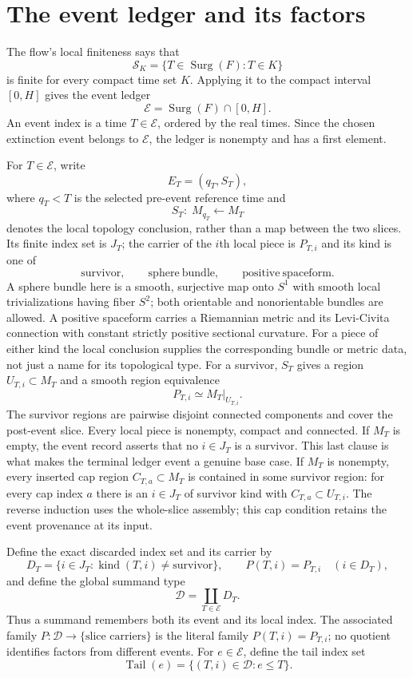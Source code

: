 \section{The event ledger and its factors}
\label{sec:finite-event-ledger}

The flow's local finiteness says that
\[
  \mathcal S_K=\{T\in\operatorname{Surg}(F):T\in K\}
\]
is finite for every compact time set $K$.  Applying it to the compact interval
$[0,H]$ gives the event ledger
\begin{equation}
  \mathcal E=\operatorname{Surg}(F)\cap[0,H].
  \label{eq:finite-ledger}
\end{equation}
An event index is a time $T\in\mathcal E$, ordered by the real
times.  Since the chosen extinction event belongs to $\mathcal E$, the ledger
is nonempty and has a first element.

For $T\in\mathcal E$, write
\[
  E_T=(q_T,S_T),
\]
where $q_T<T$ is the selected pre-event reference time and
\[
  S_T:\;M_{q_T}\longleftarrow M_T
\]
denotes the local topology conclusion, rather than a map between the two
slices.  Its finite index set is $J_T$; the carrier
of the $i$th local piece is $P_{T,i}$ and its kind is one of
\[
  \mathrm{survivor},\qquad \mathrm{sphere\ bundle},\qquad
  \mathrm{positive\ spaceform}.
\]
A sphere bundle here is a smooth, surjective map onto $S^1$ with smooth local
trivializations having fiber $S^2$; both orientable and nonorientable bundles
are allowed.  A positive spaceform carries a Riemannian metric and its
Levi-Civita connection with constant strictly positive sectional curvature.
For a piece of either kind the local conclusion supplies the corresponding
bundle or metric data, not just a name for its topological type.
For a survivor, $S_T$ gives a region $U_{T,i}\subset M_T$ and a smooth region
equivalence
\[
  P_{T,i}\simeq M_T|_{U_{T,i}}.
\]
The survivor regions are pairwise disjoint connected components and cover the
post-event slice.  Every local piece is nonempty, compact and connected.  If $M_T$ is
empty, the event record asserts that no $i\in J_T$ is a survivor.  This last
clause is what makes the terminal ledger event a genuine base case.
If $M_T$ is nonempty, every inserted cap region $C_{T,a}\subset M_T$ is
contained in some survivor region: for every cap index $a$ there is an
$i\in J_T$ of survivor kind with $C_{T,a}\subset U_{T,i}$.
The reverse induction uses the whole-slice assembly; this cap condition
retains the event provenance at its input.

Define the exact discarded index set and its carrier by
\[
  D_T=\{i\in J_T:\operatorname{kind}(T,i)\neq\mathrm{survivor}\},
  \qquad P(T,i)=P_{T,i}\quad(i\in D_T),
\]
and define the global summand type
\begin{equation}
  \mathcal D=\coprod_{T\in\mathcal E}D_T.
  \label{eq:global-discarded-index}
\end{equation}
Thus a summand remembers both its event and its local index.  The associated
family $P:\mathcal D\to\{\text{slice carriers}\}$ is the literal family
$P(T,i)=P_{T,i}$; no quotient identifies factors from different events.
For $e\in\mathcal E$, define the tail index set
\[
  \operatorname{Tail}(e)=\{(T,i)\in\mathcal D:e\leq T\}.
\]

